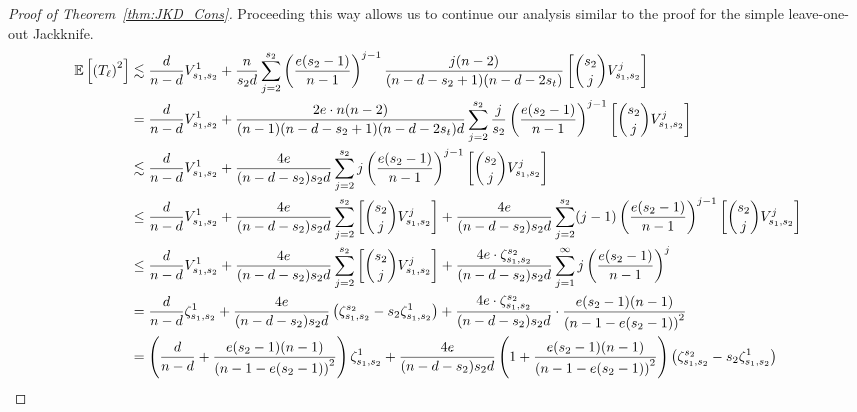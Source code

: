 \begin{proof}[Proof of Theorem~\ref{thm:JKD_Cons}]
	Proceeding this way allows us to continue our analysis similar to the proof for
	the simple leave-one-out Jackknife.
	\begin{equation}
		\begin{aligned}
			\mathbb{E}\left[\left(T_{\ell}\right)^2\right]
			 & \lesssim \frac{d}{n - d} V_{s_1, s_2}^{1} + \frac{n}{s_2 d}\sum_{j = 2}^{s_2}\left(\frac{e (s_2 - 1)}{n - 1}\right)^{j-1}
			\frac{j (n - 2)}{(n - d - s_2 + 1)(n - d - 2s_t)}\left[\binom{s_2}{j}V_{s_1, s_2}^{j}\right]                                                   \\
			 & = \frac{d}{n - d} V_{s_1, s_2}^{1} + \frac{ 2 e \cdot n (n - 2)}{(n - 1)(n - d - s_2 + 1)(n - d - 2s_t)d}
			\sum_{j = 2}^{s_2}\frac{j}{s_2} \left(\frac{e (s_2 - 1)}{n - 1}\right)^{j-1}
			\left[\binom{s_2}{j}V_{s_1, s_2}^{j}\right]                                                                                                    \\
			 & \lesssim \frac{d}{n - d} V_{s_1, s_2}^{1} + \frac{4e}{(n - d - s_2)s_2 d}
			\sum_{j = 2}^{s_2}j  \left(\frac{e (s_2 - 1)}{n - 1}\right)^{j-1}
			\left[\binom{s_2}{j}V_{s_1, s_2}^{j}\right]                                                                                                    \\
			 & \leq  \frac{d}{n - d} V_{s_1, s_2}^{1}
			+ \frac{4e}{(n - d - s_2)s_2 d} \sum_{j = 2}^{s_2}\left[\binom{s_2}{j}V_{s_1, s_2}^{j}\right]
			+ \frac{4e}{(n - d - s_2)s_2 d} \sum_{j = 2}^{s_2}(j-1)\left(\frac{e (s_2 - 1)}{n - 1}\right)^{j-1}\left[\binom{s_2}{j}V_{s_1, s_2}^{j}\right] \\
			 & \leq  \frac{d}{n - d} V_{s_1, s_2}^{1}
			+ \frac{4e}{(n - d - s_2)s_2 d} \sum_{j = 2}^{s_2}\left[\binom{s_2}{j}V_{s_1, s_2}^{j}\right]
			+ \frac{4e \cdot \zeta_{s_1, s_2}^{s_2}}{(n - d - s_2)s_2 d} \sum_{j = 1}^{\infty}j\left(\frac{e (s_2 - 1)}{n - 1}\right)^{j}                  \\
			 & = \frac{d}{n - d} \zeta_{s_1, s_2}^{1}
			+ \frac{4e}{(n - d - s_2)s_2 d} \left(\zeta_{s_1, s_2}^{s_2} - s_2 \zeta_{s_1, s_2}^{1}\right)
			+ \frac{4e \cdot \zeta_{s_1, s_2}^{s_2}}{(n - d - s_2)s_2 d} \cdot \frac{e (s_2 - 1)(n - 1)}{\left(n - 1 - e (s_2 - 1)\right)^2}               \\
			 & = \left(\frac{d}{n - d} + \frac{e (s_2 - 1)(n - 1)}{\left(n - 1 - e (s_2 - 1)\right)^2}\right) \zeta_{s_1, s_2}^{1}
			+ \frac{4e}{(n - d - s_2)s_2 d}\left(1 + \frac{e (s_2 - 1)(n - 1)}{\left(n - 1 - e (s_2 - 1)\right)^2}\right) \left(\zeta_{s_1, s_2}^{s_2} - s_2 \zeta_{s_1, s_2}^{1}\right)
		\end{aligned}
	\end{equation}


\end{proof}
